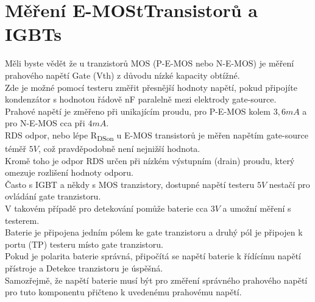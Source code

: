 \section{Měření E-MOStTransistorů a IGBTs}
Měli byste vědět že u tranzistorů MOS (P-E-MOS nebo N-E-MOS) je měření prahového napětí Gate (Vth) z důvodu nízké kapacity obtížné.\\Zde je možné pomocí testeru změřit přesnější hodnoty napětí, pokud připojíte kondenzátor s hodnotou řádově nF paralelně mezi elektrody gate-source.\\
Prahové napětí je změřeno při unikajícím proudu, pro P-E-MOS kolem \(3,6mA\) a pro N-E-MOS cca při \(4mA\).\\
RDS odpor, nebo lépe R\textsubscript{DSon} u E-MOS transistorů je měřen napětím gate-source téměř \(5V\), což pravděpodobně není nejnižší hodnota.\\
Kromě toho je odpor RDS určen při nízkém výstupním (drain) proudu, který omezuje rozlišení hodnoty odporu.\\Často s IGBT a někdy s MOS tranzistory, dostupné napětí testeru \(5V\) nestačí pro ovládání gate tranzistoru.\\
 V takovém případě pro detekování pomůže baterie cca \(3V\) a umožní měření s testerem.\\
Baterie je připojena jedním pólem ke gate tranzistoru a druhý pól je připojen k portu (TP) testeru místo gate tranzistoru.\\
Pokud je polarita baterie správná,  připočítá se napětí baterie k řídícímu napětí přístroje a
Detekce tranzistoru je úspěšná.\\Samozřejmě, že napětí baterie musí být pro změření správného prahového napětí pro tuto komponentu přičteno k uvedenému prahovému napětí.

